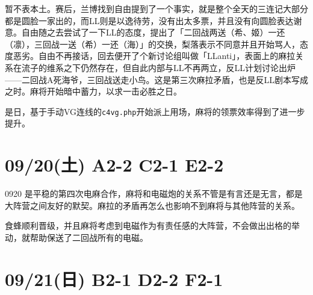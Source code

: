 暂不表本土。赛后，兰博找到自由提到了一个事实，就是整个全天的三连记大部分都是圆脸一家出的，而LL则是以逸待劳，没有出太多票，并且没有向圆脸表达谢意。自由随之去尝试了一下LL的态度，提出了「二回战两送（希、姬）一还（凛），三回战一送（希）一还（海）」的交换，梨落表示不同意并且开始骂人，态度恶劣。自由不再接话，回去便开了个新讨论组叫做「LLanti」，表面上的麻拉关系在流子的维系之下仍然存在，但自此内部与LL不再两立，反LL计划讨论出炉——二回战A死海爷，三回战送走小鸟。这是第三次麻拉矛盾，也是反LL剧本写成之时。麻将开始暗中蓄力，以求一击必胜之日。

是日，基于手动VG连线的\verb=c4vg.php=开始派上用场，麻将的领票效率得到了进一步提升。

\section{09/20(土) A2-2 C2-1 E2-2}


0920 是平稳的第四次电麻合作，麻将和电磁炮的关系不管是有言还是无言，都是大阵营之间友好的默契。麻拉的矛盾再怎么也影响不到麻将与其他阵营的关系。

食蜂顺利晋级，并且麻将考虑到电磁作为有责任感的大阵营，不会做出出格的举动，就帮助保送了二回战所有的电磁。

\section{09/21(日) B2-1 D2-2 F2-1}


